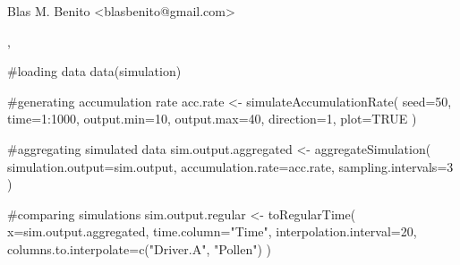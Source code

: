 \documentclass[letterpaper]{book}
\begin{document}
%
\begin{Author}\relax
Blas M. Benito  <blasbenito@gmail.com>
\end{Author}
%
\begin{SeeAlso}\relax
{}, 
\end{SeeAlso}
%
\begin{Examples}
\begin{ExampleCode}
#loading data
data(simulation)

#generating accumulation rate
acc.rate <- simulateAccumulationRate(
 seed=50,
 time=1:1000,
 output.min=10,
 output.max=40,
 direction=1,
 plot=TRUE
 )

#aggregating simulated data
sim.output.aggregated <- aggregateSimulation(
 simulation.output=sim.output,
 accumulation.rate=acc.rate,
 sampling.intervals=3
 )

#comparing simulations
sim.output.regular <- toRegularTime(
 x=sim.output.aggregated,
 time.column="Time",
 interpolation.interval=20,
 columns.to.interpolate=c("Driver.A", "Pollen")
 )

\end{ExampleCode}
\end{Examples}
\printindex{}
\end{document}

